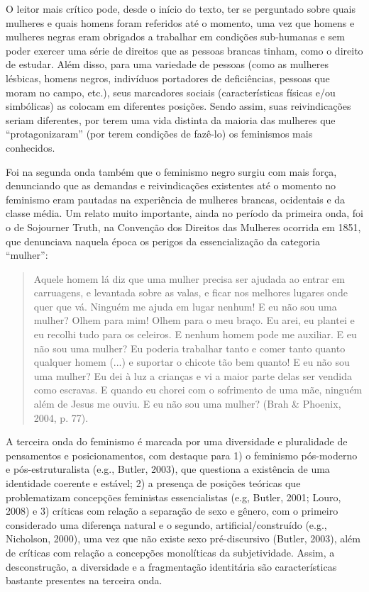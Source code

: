 O leitor mais crítico pode, desde o início do texto, ter se perguntado sobre quais mulheres e quais homens foram referidos até o momento, uma vez que homens e mulheres negras eram obrigados a trabalhar em condições sub-humanas e sem poder exercer uma série de direitos que as pessoas brancas tinham, como o direito de estudar. Além disso, para uma variedade de pessoas (como as mulheres lésbicas, homens negros, indivíduos portadores de deficiências, pessoas que moram no campo, etc.), seus marcadores sociais (características físicas e/ou simbólicas) as colocam em diferentes posições. Sendo assim, suas reivindicações seriam diferentes, por terem uma vida distinta da maioria das mulheres que ``protagonizaram'' (por terem condições de fazê-lo) os feminismos mais conhecidos. 

Foi na segunda onda também que o feminismo negro surgiu com mais força, denunciando que as demandas e reivindicações existentes até o momento no feminismo eram pautadas na experiência de mulheres brancas, ocidentais e da classe média. Um relato muito importante, ainda no período da primeira onda, foi o de Sojourner Truth, na Convenção dos Direitos das Mulheres ocorrida em 1851, que denunciava naquela época os perigos da essencialização da categoria ``mulher'': 

\begin{quote}
    Aquele homem lá diz que uma mulher precisa ser ajudada ao entrar em carruagens, e levantada sobre as valas, e ficar nos melhores lugares onde quer que vá. Ninguém me ajuda em lugar nenhum! E eu não sou uma mulher? Olhem para mim! Olhem para o meu braço. Eu arei, eu plantei e eu recolhi tudo para os celeiros. E nenhum homem pode me auxiliar. E eu não sou uma mulher? Eu poderia trabalhar tanto e comer tanto quanto qualquer homem (...) e suportar o chicote tão bem quanto! E eu não sou uma mulher? Eu dei à luz a crianças e vi a maior parte delas ser vendida como escravas. E quando eu chorei com o sofrimento de uma mãe, ninguém além de Jesus me ouviu. E eu não sou uma mulher? (Brah \& Phoenix, 2004, p. 77).
\end{quote}

A terceira onda do feminismo é marcada por uma diversidade e pluralidade de pensamentos e posicionamentos, com destaque para 1) o feminismo pós-moderno e pós-estruturalista (e.g., Butler, 2003), que questiona a existência de uma identidade coerente e estável; 2) a presença de posições teóricas que problematizam concepções feministas essencialistas (e.g, Butler, 2001; Louro, 2008) e 3) críticas com relação a separação de sexo e gênero, com o primeiro considerado uma diferença natural e o segundo, artificial/construído (e.g., Nicholson, 2000), uma vez que não existe sexo pré-discursivo (Butler, 2003), além de críticas com relação a concepções monolíticas da subjetividade. Assim, a desconstrução, a diversidade e a fragmentação identitária são características bastante presentes na terceira onda.

